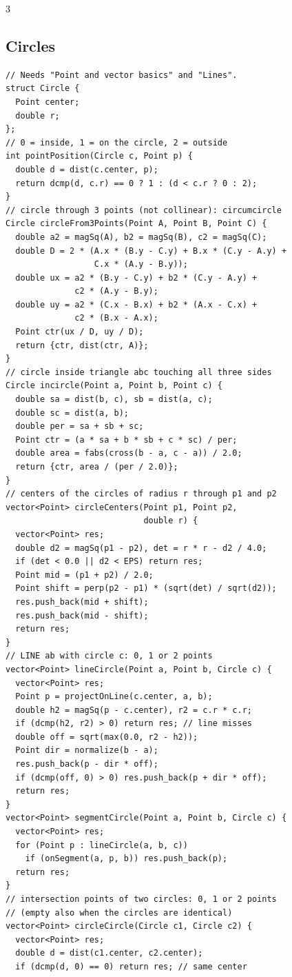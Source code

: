 \documentclass[8pt, a4paper]{article}
\begin{document}
\begin{multicols*}{3}
\subsection{Circles}
\begin{lstlisting}
// Needs "Point and vector basics" and "Lines".
struct Circle {
  Point center;
  double r;
};
// 0 = inside, 1 = on the circle, 2 = outside
int pointPosition(Circle c, Point p) {
  double d = dist(c.center, p);
  return dcmp(d, c.r) == 0 ? 1 : (d < c.r ? 0 : 2);
}
// circle through 3 points (not collinear): circumcircle
Circle circleFrom3Points(Point A, Point B, Point C) {
  double a2 = magSq(A), b2 = magSq(B), c2 = magSq(C);
  double D = 2 * (A.x * (B.y - C.y) + B.x * (C.y - A.y) +
                  C.x * (A.y - B.y));
  double ux = a2 * (B.y - C.y) + b2 * (C.y - A.y) +
              c2 * (A.y - B.y);
  double uy = a2 * (C.x - B.x) + b2 * (A.x - C.x) +
              c2 * (B.x - A.x);
  Point ctr(ux / D, uy / D);
  return {ctr, dist(ctr, A)};
}
// circle inside triangle abc touching all three sides
Circle incircle(Point a, Point b, Point c) {
  double sa = dist(b, c), sb = dist(a, c);
  double sc = dist(a, b);
  double per = sa + sb + sc;
  Point ctr = (a * sa + b * sb + c * sc) / per;
  double area = fabs(cross(b - a, c - a)) / 2.0;
  return {ctr, area / (per / 2.0)};
}
// centers of the circles of radius r through p1 and p2
vector<Point> circleCenters(Point p1, Point p2,
                            double r) {
  vector<Point> res;
  double d2 = magSq(p1 - p2), det = r * r - d2 / 4.0;
  if (det < 0.0 || d2 < EPS) return res;
  Point mid = (p1 + p2) / 2.0;
  Point shift = perp(p2 - p1) * (sqrt(det) / sqrt(d2));
  res.push_back(mid + shift);
  res.push_back(mid - shift);
  return res;
}
// LINE ab with circle c: 0, 1 or 2 points
vector<Point> lineCircle(Point a, Point b, Circle c) {
  vector<Point> res;
  Point p = projectOnLine(c.center, a, b);
  double h2 = magSq(p - c.center), r2 = c.r * c.r;
  if (dcmp(h2, r2) > 0) return res; // line misses
  double off = sqrt(max(0.0, r2 - h2));
  Point dir = normalize(b - a);
  res.push_back(p - dir * off);
  if (dcmp(off, 0) > 0) res.push_back(p + dir * off);
  return res;
}
vector<Point> segmentCircle(Point a, Point b, Circle c) {
  vector<Point> res;
  for (Point p : lineCircle(a, b, c))
    if (onSegment(a, p, b)) res.push_back(p);
  return res;
}
// intersection points of two circles: 0, 1 or 2 points
// (empty also when the circles are identical)
vector<Point> circleCircle(Circle c1, Circle c2) {
  vector<Point> res;
  double d = dist(c1.center, c2.center);
  if (dcmp(d, 0) == 0) return res; // same center

\end{lstlisting}
\end{multicols*}
\end{document}
